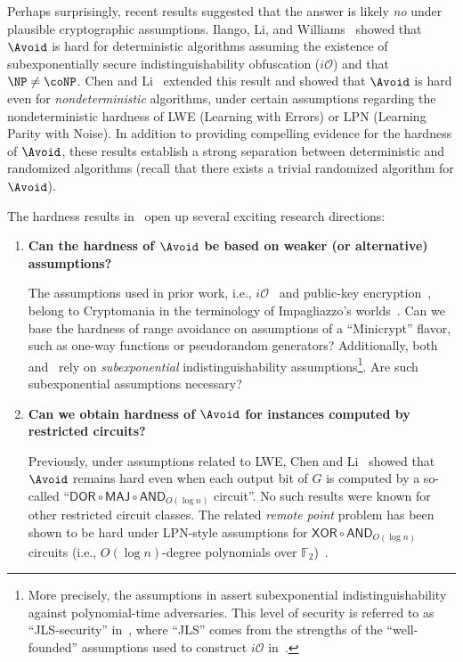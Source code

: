 \documentclass[10pt,a4paper]{article}
\theoremstyle{definition}
\theoremstyle{remark}
\newcommand{\MAJ}{\mathsf{MAJ}}
\newcommand{\DOR}{\mathsf{DOR}}
\newcommand{\AND}{\mathsf{AND}}
\newcommand{\XOR}{\mathsf{XOR}}
\newcommand{\F}{\mathbb{F}}
\newcommand{\iO}{i\mathcal{O}}
\begin{document}
Perhaps surprisingly, recent results suggested that the answer is likely \emph{no} under plausible cryptographic assumptions. Ilango, Li, and Williams~\cite{DBLP:conf/stoc/IlangoLW23} showed that $\Avoid$ is hard for deterministic algorithms assuming the existence of subexponentially secure indistinguishability obfuscation ($\iO$) and that $\NP\neq \coNP$. Chen and Li~\cite{DBLP:conf/stoc/ChenL24} extended this result and showed that $\Avoid$ is hard even for \emph{nondeterministic} algorithms, under certain assumptions regarding the nondeterministic hardness of LWE (Learning with Errors) or LPN (Learning Parity with Noise). In addition to providing compelling evidence for the hardness of $\Avoid$, these results establish a strong separation between deterministic and randomized algorithms (recall that there exists a trivial randomized algorithm for $\Avoid$). %

The hardness results in~\cite{DBLP:conf/stoc/IlangoLW23, DBLP:conf/stoc/ChenL24} open up several exciting research directions:
\begin{enumerate}
    \item {\bf Can the hardness of $\Avoid$ be based on weaker (or alternative) assumptions?}
    
    The assumptions used in prior work, i.e., $\iO$~\cite{DBLP:conf/stoc/IlangoLW23} and public-key encryption~\cite{DBLP:conf/stoc/ChenL24}, belong to Cryptomania in the terminology of Impagliazzo's worlds~\cite{Impagliazzo95}. Can we base the hardness of range avoidance on assumptions of a ``Minicrypt'' flavor, such as one-way functions or pseudorandom generators? Additionally, both~\cite{DBLP:conf/stoc/IlangoLW23} and~\cite{DBLP:conf/stoc/ChenL24} rely on \emph{subexponential} indistinguishability assumptions\footnote{More precisely, the assumptions in \cite{DBLP:conf/stoc/IlangoLW23, DBLP:conf/stoc/ChenL24} assert subexponential indistinguishability against polynomial-time adversaries. This level of security is referred to as ``JLS-security'' in~\cite{DBLP:conf/stoc/IlangoLW23}, where ``JLS'' comes from the strengths of the ``well-founded'' assumptions used to construct $\iO$ in~\cite{JainLS21}.}. Are such subexponential assumptions necessary?
    \item {\bf Can we obtain hardness of $\Avoid$ for instances computed by restricted circuits?}
    
    Previously, under assumptions related to LWE, Chen and Li~\cite{DBLP:conf/stoc/ChenL24} showed that $\Avoid$ remains hard even when each output bit of $G$ is computed by a so-called ``$\DOR\circ\MAJ\circ\AND_{O(\log n)}$ circuit''. No such results were known for other restricted circuit classes. The related \emph{remote point} problem has been shown to be hard under LPN-style assumptions for $\XOR\circ\AND_{O(\log n)}$ circuits (i.e., $O(\log n)$-degree polynomials over $\F_2$)~\cite{DBLP:conf/stoc/ChenL24}.
\end{enumerate}
\end{document}
